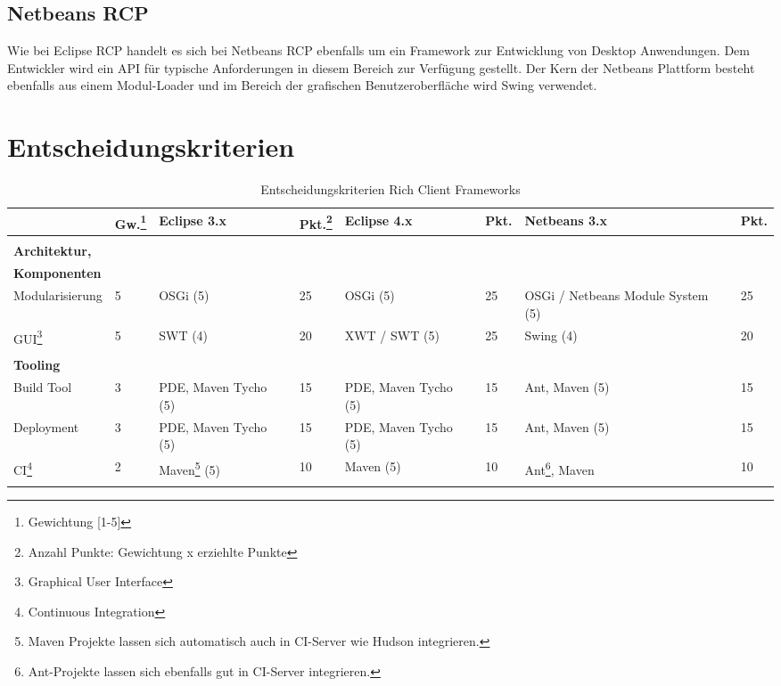 \subsection{Netbeans RCP}
Wie bei Eclipse RCP handelt es sich bei Netbeans RCP ebenfalls um ein Framework zur Entwicklung von Desktop Anwendungen. Dem Entwickler wird ein API für typische Anforderungen in diesem Bereich zur Verfügung gestellt. Der Kern der Netbeans Plattform besteht ebenfalls aus einem Modul-Loader und im Bereich der grafischen Benutzeroberfläche wird Swing verwendet.

\section{Entscheidungskriterien}
\begin{longtable}{|p{2.8cm}|p{0.7cm}|p{2.1cm}|p{0.7cm}|p{2.1cm}|p{0.7cm}|p{2.2cm}|p{0.7cm}|}
    \caption{Entscheidungskriterien Rich Client Frameworks}\\\hline
  & \textbf{Gw.\footnote{Gewichtung [1-5]}} & \textbf{Eclipse 3.x}& \textbf{Pkt.\footnote{Anzahl Punkte: Gewichtung x erziehlte Punkte}} & \textbf{Eclipse 4.x} &\textbf{Pkt.} & \textbf{Netbeans 3.x}& \textbf{Pkt.}\\\hline
 \multicolumn{8}{|l|}{}\\  
\multicolumn{8}{|l|}{\textbf{Architektur,}}\\
  \multicolumn{8}{|l|}{\textbf{Komponenten}}\\\hline
  Modularisierung &5 & OSGi (5) & 25 & OSGi (5) & 25 & OSGi / Netbeans Module System (5) & 25\\\hline
  GUI\footnote{Graphical User Interface} &5 & SWT (4) & 20 & XWT / SWT (5) & 25 & Swing (4) & 20\\\hline
  \multicolumn{8}{|l|}{}\\
  \multicolumn{8}{|l|}{\textbf{Tooling}}\\\hline
  Build Tool &3 & PDE, Maven Tycho (5) & 15 & PDE, Maven Tycho (5) & 15 & Ant, Maven (5) & 15\\\hline
  Deployment & 3 & PDE, Maven Tycho (5) & 15 & PDE, Maven Tycho (5) & 15 & Ant, Maven (5)& 15\\\hline
 CI\footnote{Continuous Integration} &2 & Maven\footnote{Maven Projekte lassen sich automatisch auch in CI-Server wie Hudson integrieren.} (5) & 10 &Maven (5) & 10& Ant\footnote{Ant-Projekte lassen sich ebenfalls gut in CI-Server integrieren.}, Maven & 10\\\hline 
 \multicolumn{8}{|l|}{}\\

\end{longtable}
